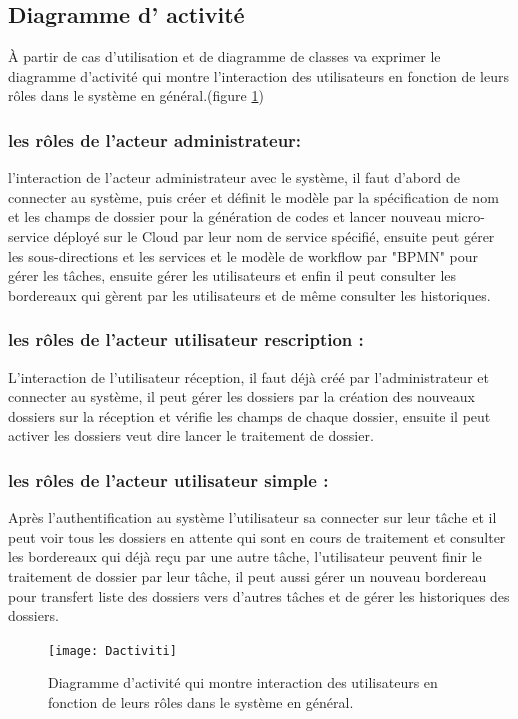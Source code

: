 \subsection{Diagramme d' activité  }

À partir de cas d'utilisation et de diagramme de classes  va exprimer  le diagramme d'activité qui  montre l'interaction des  utilisateurs   en fonction de leurs rôles dans le système en général.(figure \ref{fig:dactiviti})

\subsubsection{les rôles de l'acteur administrateur: }
l'interaction de l'acteur administrateur avec le système, il faut d'abord de connecter au système, puis créer et définit le modèle par la spécification de nom et les champs de dossier pour la génération de codes et lancer nouveau micro-service déployé sur le Cloud par leur nom de service spécifié, ensuite peut gérer les sous-directions et les services et le modèle de workflow par "BPMN" pour gérer les tâches, ensuite gérer les utilisateurs et enfin il peut consulter les bordereaux qui gèrent par les utilisateurs et de même consulter les historiques.
\subsubsection{les rôles de l'acteur utilisateur rescription : }
L'interaction de l'utilisateur réception, il faut déjà créé par l'administrateur et connecter au système, il peut gérer les dossiers par la création des nouveaux dossiers sur la réception et vérifie les champs de chaque dossier, ensuite il peut activer les dossiers veut dire lancer le  traitement de dossier.

\subsubsection{les rôles de l'acteur utilisateur simple : } 
Après l'authentification au système l'utilisateur sa connecter sur leur tâche et il peut voir tous les dossiers en attente qui sont en cours de traitement et consulter les bordereaux qui déjà reçu par une autre tâche, l'utilisateur peuvent finir le traitement de dossier par leur tâche, il peut aussi gérer un nouveau bordereau pour transfert liste des dossiers vers d'autres tâches et de gérer les historiques des dossiers.
   
   \begin{figure}[H]
   	\centering
   	\texttt{[image: Dactiviti]}
   	\caption{Diagramme d'activité qui  montre interaction des  utilisateurs   en fonction de leurs rôles dans le système en général.}
   	\label{fig:dactiviti}
   \end{figure}
     
